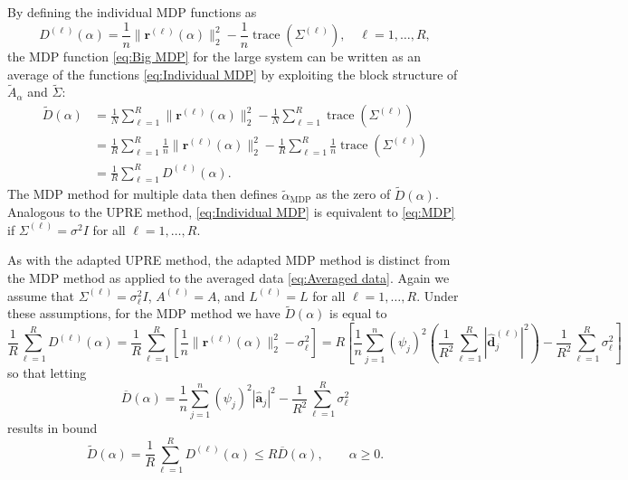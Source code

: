 \documentclass[12pt]{article}
\newcommand{\aVec}{\mathbf{a}}	%
\newcommand{\dVec}{\mathbf{d}}	%
\newcommand{\rVec}{\mathbf{r}}	%
\DeclareMathOperator{\trace}{trace}		%
\newcommand{\dft}[1]{\widehat{#1}}	%
\newcommand{\regparam}{\alpha}
\newcommand{\mfilt}{\psi}
\newcommand{\noiseSD}{\sigma}	%
\newcommand{\D}{D}	%
\begin{document}
By defining the individual MDP functions as
\begin{equation}
\label{eq:Individual MDP}
\D^{(\ell)}(\regparam) = \frac{1}{n}\|\rVec^{(\ell)}(\regparam)\|_2^2 - \frac{1}{n}\trace\left(\Sigma^{(\ell)}\right), \quad \ell = 1,\ldots,R,
\end{equation}
the MDP function \eqref{eq:Big MDP} for the large system can be written as an average of the functions \eqref{eq:Individual MDP} by exploiting the block structure of $\widetilde{A}_{\regparam}$ and $\widetilde{\Sigma}$:
\begin{align}
\label{eq:Averaged MDP}
\widetilde{\D}(\regparam) &= \frac{1}{N}\sum_{\ell=1}^R \|\rVec^{(\ell)}(\regparam)\|_2^2 - \frac{1}{N}\sum_{\ell=1}^R \trace\left(\Sigma^{(\ell)}\right) \nonumber \\
&= \frac{1}{R}\sum_{\ell=1}^R \frac{1}{n}\|\rVec^{(\ell)}(\regparam)\|_2^2 - \frac{1}{R}\sum_{\ell=1}^R \frac{1}{n}\trace\left(\Sigma^{(\ell)}\right) \nonumber \\
&= \frac{1}{R}\sum_{\ell=1}^R \D^{(\ell)}(\regparam).
\end{align}
The MDP method for multiple data then defines $\widetilde{\regparam}_{\textrm{MDP}}$ as the zero of $\widetilde{\D}(\regparam)$. Analogous to the UPRE method, \eqref{eq:Individual MDP} is equivalent to \eqref{eq:MDP} if $\Sigma^{(\ell)} = \noiseSD^2 I$ for all $\ell = 1,\ldots,R$. \par 
As with the adapted UPRE method, the adapted MDP method is distinct from the MDP method as applied to the averaged data \eqref{eq:Averaged data}. Again we assume that $\Sigma^{(\ell)} = \noiseSD_\ell^2 I$, $A^{(\ell)} = A$, and $L^{(\ell)} = L$ for all $\ell = 1,\ldots,R$. Under these assumptions, for the MDP method we have $\widetilde{\D}(\regparam)$ is equal to
\[\frac{1}{R} \sum_{\ell=1}^R \D^{(\ell)}(\regparam) = \frac{1}{R}\sum_{\ell=1}^R \left[\frac{1}{n}\|\rVec^{(\ell)}(\regparam)\|_2^2 - \noiseSD_{\ell}^2\right] = R\left[\frac{1}{n}\sum_{j=1}^{n} \left(\mfilt_j\right)^2\left(\frac{1}{R^2} \sum_{\ell=1}^R |\dft{\dVec}_j^{(\ell)}|^2\right) - \frac{1}{R^2}\sum_{\ell=1}^R \noiseSD_{\ell}^2\right]\]
so that letting
\[\overline{\D}(\regparam) = \frac{1}{n}\sum_{j=1}^{n} \left(\mfilt_j\right)^2 |\dft{\aVec}_j|^2 - \frac{1}{R^2}\sum_{\ell=1}^R \noiseSD_{\ell}^2\]
results in bound
\begin{equation}
\label{eq:MDP Bound}
\widetilde{\D}(\regparam) = \frac{1}{R} \sum_{\ell=1}^R \D^{(\ell)}(\regparam) \leq R \overline{\D}(\regparam), \qquad \regparam \geq 0.
\end{equation}
\end{document}
